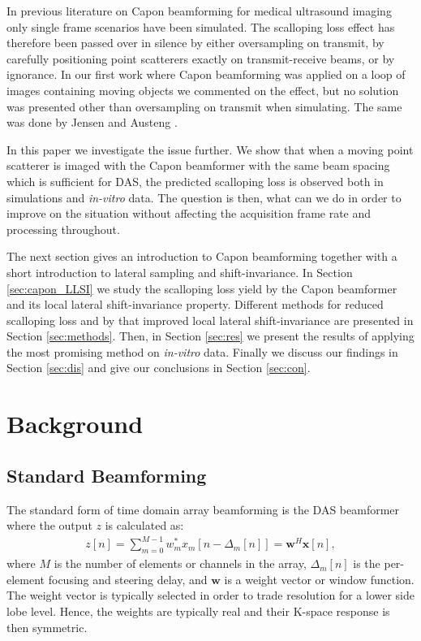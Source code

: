 \documentclass[draftcls]{IEEEtran}
\renewcommand{\vec}[1]{\mathbf{#1}}
\newcommand\comment[1]{\textit{{\color{red}(#1)}}}
\begin{document}
In previous literature on Capon beamforming for medical ultrasound imaging only single frame scenarios have been simulated. The scalloping loss effect has therefore been passed over in silence by either oversampling on transmit, by carefully positioning point scatterers exactly on transmit-receive beams, or by ignorance. In our first work where Capon beamforming was applied on a loop of images containing moving objects \cite{Asen2012, Asen} we commented on the effect, but no solution was presented other than oversampling on transmit when simulating. The same was done by Jensen and Austeng \cite{Jensen2012}.

In this paper we investigate the issue further. We show that when a moving point scatterer is imaged with the Capon beamformer with the same beam spacing which is sufficient for DAS, the predicted scalloping loss is observed both in simulations and \textit{in-vitro} data. The question is then, what can we do in order to improve on the situation without affecting the acquisition frame rate and processing throughout. %

The next section gives an introduction to Capon beamforming together with a short introduction to lateral sampling and shift-invariance. In Section \ref{sec:capon_LLSI} we study the scalloping loss yield by the Capon beamformer and its local lateral shift-invariance property.  Different methods for reduced scalloping loss and by that improved local lateral shift-invariance are presented in Section \ref{sec:methods}. Then, in Section \ref{sec:res} we present the results of applying the most promising method on \textit{in-vitro} data. Finally we discuss our findings in Section \ref{sec:dis} and give our conclusions in Section \ref{sec:con}.



\section{Background}
\subsection{Standard Beamforming}
The standard form of time domain array beamforming is the DAS beamformer where the output $z$ is calculated as:
\begin{align}\label{eq:das}
z[n] = \sum_{m = 0}^{M-1}w_m^*x_m[n - \Delta_m[n]] = \vec{w}^H\vec{x}[n],
\end{align}
where $M$ is the number of elements or channels in the array, $\Delta_m[n]$ is the per-element focusing and steering delay, and $\vec{w}$ is a weight vector or window function. The weight vector is typically selected in order to trade resolution for a lower side lobe level. Hence, the weights are typically real and their K-space response is then symmetric.
\end{document}
